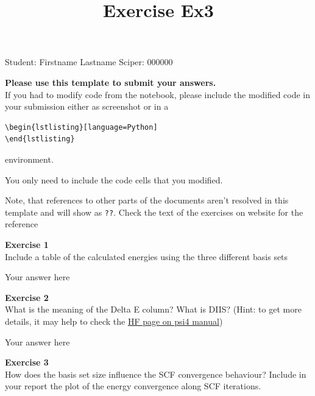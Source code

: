 \documentclass{article}
\title{Exercise Ex3}
\begin{document}
\maketitle\maketitle
\begin{center}\logo\end{center}


Student:  Firstname Lastname    Sciper: 000000

\begin{mdframed}
\textbf{Please use this template to submit your answers.}\\
If you had to modify code from the notebook, please include the modified code in your submission either as screenshot or in a

\begin{verbatim}
\begin{lstlisting}[language=Python]
\end{lstlisting}
\end{verbatim}

environment.

You only need to include the code cells that you modified.

Note, that references to other parts of the documents aren't resolved in this template and will show as \texttt{??}. Check the text of the exercises on website for the reference
\end{mdframed}

\begin{mdframed}
\textbf{Exercise 1}\\
Include a table of the calculated energies using the three different basis sets
\end{mdframed}

Your answer here

\begin{mdframed}
\textbf{Exercise 2}\\
What is the meaning of the Delta E column? What is DIIS? (Hint: to get more details, it may help to check the \href{https://psicode.org/psi4manual/master/scf.html}{HF page on psi4 manual})
\end{mdframed}

Your answer here

\begin{mdframed}
\textbf{Exercise 3}\\
How does the basis set size influence the SCF convergence behaviour? Include in your report the plot of the energy convergence along SCF iterations.
\end{mdframed}
\end{document}
